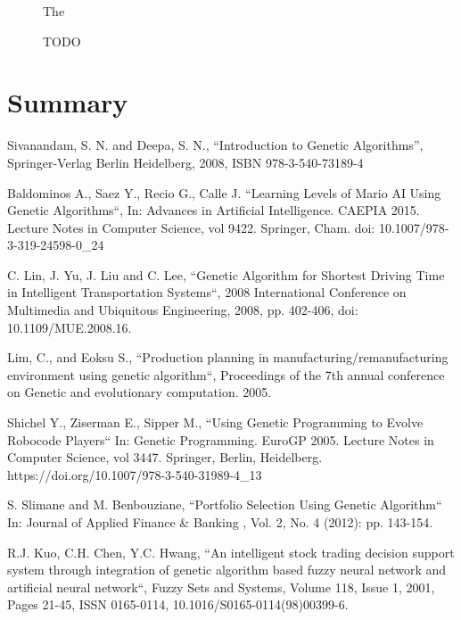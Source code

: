\documentclass[conference]{IEEEtran}
\begin{document}
\begin{figure}[htbp]
	\centering
		\resizebox{.45\textwidth}{!}{}
	\caption{The } %
	\label{foo}
\end{figure}

\begin{figure}[htbp]
	\centering
		\resizebox{.45\textwidth}{!}{}
	\caption{TODO}
	\label{foo}
\end{figure}


\section{Summary}


\begin{thebibliography}{00}

Sivanandam, S. N. and Deepa, S. N., ``Introduction to Genetic Algorithms'',
	Springer-Verlag Berlin Heidelberg, 2008, ISBN 978-3-540-73189-4

Baldominos A., Saez Y., Recio G., Calle J. ``Learning Levels of Mario AI Using Genetic Algorithms``,
	In: Advances in Artificial Intelligence. CAEPIA 2015. Lecture Notes in Computer Science, vol 9422. Springer, Cham. doi: 10.1007/978-3-319-24598-0\_24

C. Lin, J. Yu, J. Liu and C. Lee, ``Genetic Algorithm for Shortest Driving Time in Intelligent Transportation Systems``, 2008 International Conference on Multimedia and Ubiquitous Engineering, 2008, pp. 402-406, doi: 10.1109/MUE.2008.16.

Lim, C., and Eoksu S., ``Production planning in manufacturing/remanufacturing environment using genetic algorithm``, Proceedings of the 7th annual conference on Genetic and evolutionary computation. 2005.

Shichel Y., Ziserman E., Sipper M., ``Using Genetic Programming to Evolve Robocode Players`` In: Genetic Programming. EuroGP 2005. Lecture Notes in Computer Science, vol 3447. Springer, Berlin, Heidelberg. https://doi.org/10.1007/978-3-540-31989-4\_13

S. Slimane and M. Benbouziane, ``Portfolio Selection Using Genetic Algorithm`` In: Journal of Applied Finance \& Banking , Vol. 2, No. 4 (2012): pp. 143-154.

R.J. Kuo, C.H. Chen, Y.C. Hwang, ``An intelligent stock trading decision support system through integration of genetic algorithm based fuzzy neural network and artificial neural network``,
Fuzzy Sets and Systems,
Volume 118, Issue 1,
2001,
Pages 21-45,
ISSN 0165-0114,
10.1016/S0165-0114(98)00399-6.


\end{thebibliography}
\end{document}
